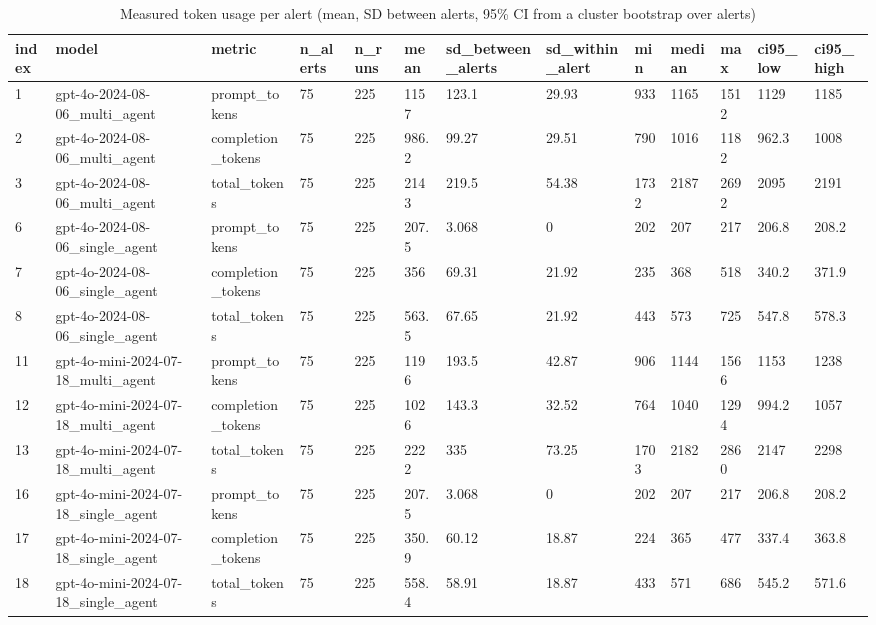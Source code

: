 \begin{table}[!t]
\centering
\caption{Measured token usage per alert (mean, SD between alerts, 95\% CI from a cluster bootstrap over alerts)}
\label{tab:tokens}
\begin{tabular}{lllllllllllll}
\hline
index & model & metric & n\_alerts & n\_runs & mean & sd\_between\_alerts & sd\_within\_alert & min & median & max & ci95\_low & ci95\_high \\
\hline
1 & gpt-4o-2024-08-06\_multi\_agent & prompt\_tokens & 75 & 225 & 1157 & 123.1 & 29.93 & 933 & 1165 & 1512 & 1129 & 1185 \\
2 & gpt-4o-2024-08-06\_multi\_agent & completion\_tokens & 75 & 225 & 986.2 & 99.27 & 29.51 & 790 & 1016 & 1182 & 962.3 & 1008 \\
3 & gpt-4o-2024-08-06\_multi\_agent & total\_tokens & 75 & 225 & 2143 & 219.5 & 54.38 & 1732 & 2187 & 2692 & 2095 & 2191 \\
6 & gpt-4o-2024-08-06\_single\_agent & prompt\_tokens & 75 & 225 & 207.5 & 3.068 & 0 & 202 & 207 & 217 & 206.8 & 208.2 \\
7 & gpt-4o-2024-08-06\_single\_agent & completion\_tokens & 75 & 225 & 356 & 69.31 & 21.92 & 235 & 368 & 518 & 340.2 & 371.9 \\
8 & gpt-4o-2024-08-06\_single\_agent & total\_tokens & 75 & 225 & 563.5 & 67.65 & 21.92 & 443 & 573 & 725 & 547.8 & 578.3 \\
11 & gpt-4o-mini-2024-07-18\_multi\_agent & prompt\_tokens & 75 & 225 & 1196 & 193.5 & 42.87 & 906 & 1144 & 1566 & 1153 & 1238 \\
12 & gpt-4o-mini-2024-07-18\_multi\_agent & completion\_tokens & 75 & 225 & 1026 & 143.3 & 32.52 & 764 & 1040 & 1294 & 994.2 & 1057 \\
13 & gpt-4o-mini-2024-07-18\_multi\_agent & total\_tokens & 75 & 225 & 2222 & 335 & 73.25 & 1703 & 2182 & 2860 & 2147 & 2298 \\
16 & gpt-4o-mini-2024-07-18\_single\_agent & prompt\_tokens & 75 & 225 & 207.5 & 3.068 & 0 & 202 & 207 & 217 & 206.8 & 208.2 \\
17 & gpt-4o-mini-2024-07-18\_single\_agent & completion\_tokens & 75 & 225 & 350.9 & 60.12 & 18.87 & 224 & 365 & 477 & 337.4 & 363.8 \\
18 & gpt-4o-mini-2024-07-18\_single\_agent & total\_tokens & 75 & 225 & 558.4 & 58.91 & 18.87 & 433 & 571 & 686 & 545.2 & 571.6 \\
\hline
\end{tabular}
\end{table}

